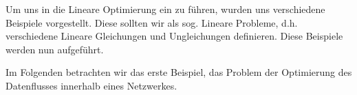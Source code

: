 Um uns in die Lineare Optimierung ein zu führen, wurden uns verschiedene Beispiele vorgestellt. Diese sollten wir als sog. Lineare Probleme, d.h. verschiedene Lineare Gleichungen und Ungleichungen definieren.
Diese Beispiele werden nun aufgeführt.

Im Folgenden betrachten wir das erste Beispiel, das Problem der Optimierung des Datenflusses innerhalb eines Netzwerkes.